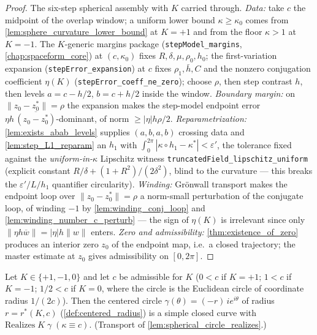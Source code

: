 \begin{proof}
  \leanok
  The six-step spherical assembly with $K$ carried through.
  \emph{Data:} take $c$ the midpoint of the overlap window; a uniform lower
  bound $\kappa\ge\kappa_0$ comes from
  \cref{lem:sphere_curvature_lower_bound} at $K=+1$ and from the floor
  $\kappa>1$ at $K=-1$. The $K$-generic margins package
  (\texttt{stepModel\_margins}, \cref{chap:spaceform_core}) at $(c,\kappa_0)$
  fixes $R,\delta,\mu,\rho_0,h_0$; the first-variation expansion
  (\texttt{stepError\_expansion}) at $c$ fixes $\rho_1,\bar h,C$ and the nonzero
  conjugation coefficient $\eta(K)$
  (\texttt{stepError\_coeff\_ne\_zero}); choose $\rho$, then step contrast $h$,
  then levels $a=c-h/2$, $b=c+h/2$ inside the window. \emph{Boundary margin:} on
  $\|z_0-z_0^\ast\|=\rho$ the expansion makes the step-model endpoint error
  $\eta h\,\overline{(z_0-z_0^\ast)}$-dominant, of norm $\ge|\eta|h\rho/2$.
  \emph{Reparametrization:} \cref{lem:exists_abab_levels} supplies $(a,b,a,b)$
  crossing data and \cref{lem:step_L1_reparam} an $h_1$ with
  $\int_0^{2\pi}|\kappa\circ h_1-\kappa^\ast|<\varepsilon'$, the tolerance fixed
  against the \emph{uniform-in-$\kappa$} Lipschitz witness
  \texttt{truncatedField\_lipschitz\_uniform} (explicit constant
  $R/\delta+(1+R^2)/(2\delta^2)$, blind to the curvature — this breaks the
  $\varepsilon'/L/h_1$ quantifier circularity). \emph{Winding:} Gr\"onwall
  transport makes the endpoint loop over $\|z_0-z_0^\ast\|=\rho$ a norm-small
  perturbation of the conjugate loop, of winding $-1$ by
  \cref{lem:winding_conj_loop} and \cref{lem:winding_number_c_perturb} — the
  sign of $\eta(K)$ is irrelevant since only
  $\|\eta h\overline{w}\|=|\eta|h\|w\|$ enters. \emph{Zero and admissibility:}
  \cref{thm:existence_of_zero} produces an interior zero $z_0$ of the endpoint
  map, i.e.\ a closed trajectory; the master estimate at $z_0$ gives
  admissibility on $[0,2\pi]$.
\end{proof}

\begin{lemma}
  \label{lem:spaceform_circle_realizes}
  Let $K\in\{+1,-1,0\}$ and let $c$ be admissible for $K$
  ($0<c$ if $K=+1$; $1<c$ if $K=-1$; $1/2<c$ if
  $K=0$, where the circle is the Euclidean circle of coordinate
  radius $1/(2c)$). Then the centered
  circle $\gamma(\theta)=(-r)\,ie^{i\theta}$ of radius $r=r^\ast(K,c)$
  (\cref{def:centered_radius}) is a simple closed curve with
  $\mathrm{Realizes}\;K\;\gamma\;(\kappa\equiv c)$. (Transport of
  \cref{lem:spherical_circle_realizes}.)
\end{lemma}

